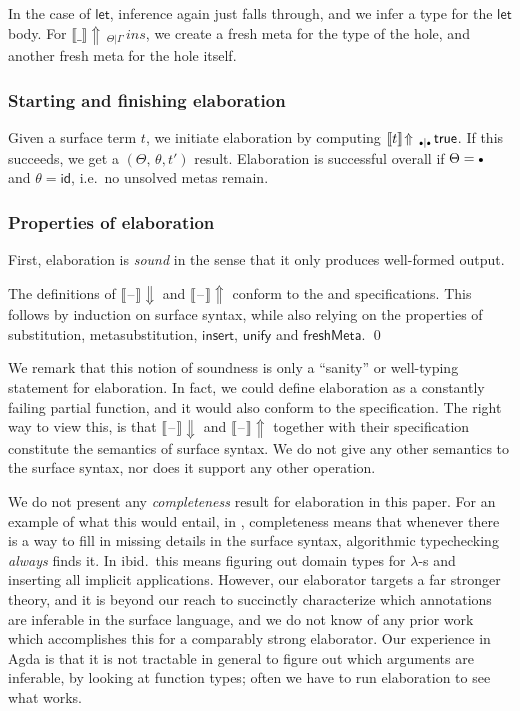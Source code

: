 \documentclass[acmsmall,review,anonymous,prologue,dvipsnames]{acmart}\settopmatter{printfolios=true,printccs=false,printacmref=false}
\newcommand{\slet}{\boldsymbol{\mathsf{let}}}
\newcommand{\emptycon}{\scaleobj{.75}\bullet}
\newcommand{\id}{\mathsf{id}}
\newcommand{\blank}{\mathord{\hspace{1pt}\text{--}\hspace{1pt}}}
\newcommand{\unify}{\mathsf{unify}}
\newcommand{\echeckblank}{\llbracket\blank\rrbracket\!\Downarrow}
\newcommand{\einferblank}{\llbracket\blank\rrbracket\!\Uparrow}
\newcommand{\einfer}[4]{\llbracket#1\rrbracket\!\Uparrow\,_{#3|#4}\,#2}
\newcommand{\true}{\mathsf{true}}
\theoremstyle{remark}
\begin{document}
In the case of $\slet$, inference again just falls through, and we infer a type
for the $\slet$ body. For $\einfer{\_}{ins}{\Theta}{\Gamma}$, we create a fresh meta
for the type of the hole, and another fresh meta for the hole itself.

\subsubsection{Starting and finishing elaboration} Given a surface term $t$,
we initiate elaboration by computing $\einfer{t}{\true}{\emptycon}{\emptycon}$. If this
succeeds, we get a $(\Theta,\,\theta,t')$ result. Elaboration is successful overall
if $\Theta = \emptycon$ and $\theta = \id$, i.e.\ no unsolved metas remain.

\subsubsection{Properties of elaboration}
First, elaboration is \emph{sound} in the sense that it only produces well-formed
output.

\begin{theorem}[Soundness] The definitions of $\echeckblank$ and
$\einferblank$ conform to the  and 
  specifications. This follows by induction on surface syntax, while also
  relying on the properties of substitution, metasubstitution,
  $\mathsf{insert}$, $\unify$ and $\mathsf{freshMeta}$. \qed
\end{theorem}

We remark that this notion of soundness is only a ``sanity'' or well-typing
statement for elaboration. In fact, we could define elaboration as a constantly
failing partial function, and it would also conform to the specification. The
right way to view this, is that $\echeckblank$ and $\einferblank$ together
with their specification constitute the semantics of surface syntax. We do not
give any other semantics to the surface syntax, nor does it support any other
operation.

We do not present any \emph{completeness} result for elaboration in this
paper. For an example of what this would entail, in \cite{dunfield2013complete},
completeness means that whenever there is a way to fill in missing details in
the surface syntax, algorithmic typechecking \emph{always} finds it. In
ibid.\ this means figuring out domain types for $\lambda$-s and inserting all
implicit applications. However, our elaborator targets a far stronger theory,
and it is beyond our reach to succinctly characterize which annotations are
inferable in the surface language, and we do not know of any prior work which
accomplishes this for a comparably strong elaborator. Our experience in Agda is
that it is not tractable in general to figure out which arguments are inferable,
by looking at function types; often we have to run elaboration to see what
works.
\end{document}
